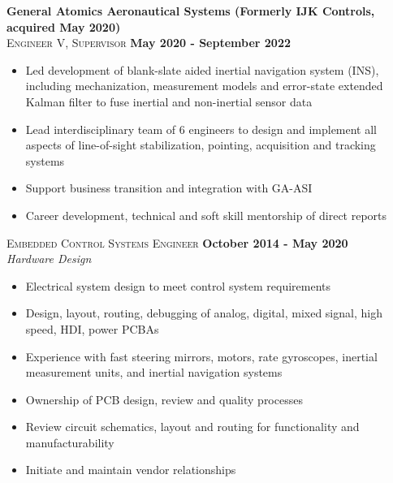 \documentclass[margin,line]{resume}
\begin{document}
\begin{resume}
    \textbf{General Atomics Aeronautical Systems (Formerly IJK Controls, acquired May 2020)}\\
    \textsc{Engineer V, Supervisor} \hfill \textbf{May 2020 - September 2022}\\ \vspace{-4mm}
    \begin{itemize} \itemsep -2pt
    		\item Led development of blank-slate aided inertial navigation system (INS), including mechanization, measurement models and error-state extended Kalman filter to fuse inertial and non-inertial sensor data
    		\item Lead interdisciplinary team of 6 engineers to design and implement all aspects of line-of-sight stabilization, pointing, acquisition and tracking systems
    		\item Support business transition and integration with GA-ASI
		\item Career development, technical and soft skill mentorship of direct reports
    	\end{itemize} \vspace{-2.25mm}
    	
    \textsc{Embedded Control Systems Engineer} \hfill \textbf{October 2014 - May 2020}\\ \vspace{-4mm}
    \textsl{Hardware Design}\\
    \begin{itemize} \itemsep -2pt
    	\item Electrical system design to meet control system requirements
        \item Design, layout, routing, debugging of analog, digital, mixed signal, high speed, HDI, power PCBAs
        \item Experience with fast steering mirrors, motors, rate gyroscopes, inertial measurement units, and inertial navigation systems
        \item Ownership of PCB design, review and quality processes
        \item Review circuit schematics, layout and routing for functionality and manufacturability
        \item Initiate and maintain vendor relationships
     \end{itemize}\vspace{-4mm}
     

\end{resume}
\end{document}
